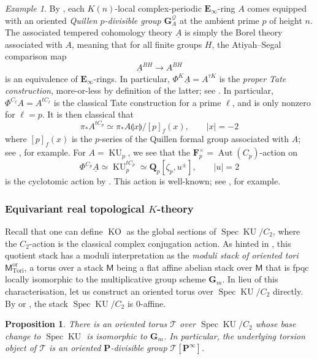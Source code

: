\documentclass[11pt, a4paper]{article}
\newcommand{\llpar}{\llparenthesis}
\newcommand{\rrpar}{\rrparenthesis}
\newcommand{\ori}{\mathrm{or}}
\DeclareMathOperator{\Spec}{Spec}
\newcommand{\1}{\mathbf{1}}
\DeclareMathOperator{\KU}{KU}
\DeclareMathOperator{\KO}{KO}
\newcommand{\Tori}{{\mathrm{Tori}}}
\DeclareMathOperator{\Aut}{Aut}
\newcommand{\ul}[1]{\underline{#1}}
\newcommand{\E}{\mathbf{E}}
\newcommand{\F}{\mathbf{F}}
\newcommand{\G}{\mathbf{G}}
\newcommand{\M}{\mathsf{M}}
\renewcommand{\P}{\mathbf{P}}
\newcommand{\Q}{\mathbf{Q}}
\newcommand{\calT}{\mathcal{T}}
\theoremstyle{plain}
\newtheorem{prop}[equation]{Proposition}
\theoremstyle{definition}
\theoremstyle{remark}\numberwithin{equation}{section}
\newtheorem{example}[equation]{Example}
\begin{document}
\begin{example}
By \cite[]{ec2}, each $K(n)$-local complex-periodic $\E_\infty$-ring $A$ comes equipped with an oriented \emph{Quillen $p$-divisible group} $\G^{\mathcal{Q}}_A$ at the ambient prime $p$ of height $n$. The associated tempered cohomology theory $\ul{A}$ is simply the Borel theory associated with $A$, meaning that for all finite groups $H$, the Atiyah--Segal comparison map
\[\ul{A}^{BH} \to A^{BH}\]
is an equivalence of $\E_\infty$-rings. In particular, $\Phi^K \ul{A} = A^{\tau K}$ is the \emph{proper Tate construction}, more-or-less by definition of the latter; see \cite[Ex.5.1.3]{temperedglobal}. In particular, $\Phi^{C_\ell} A = A^{tC_\ell}$ is the classical Tate construction for a prime $\ell$, and is only nonzero for $\ell=p$. It is then classical that 
\[\pi_\ast A^{tC_p} \simeq \pi_\ast A\llpar x\rrpar/[p]_f(x),\qquad |x|=-2\]
where $[p]_f(x)$ is the $p$-series of the Quillen formal group associated with $A$; see \cite[Lm.2.1]{ando_morava_sadofsky}, for example. For $A=\KU_p$, we see that the $\F_p^\times = \Aut(C_p)$-action on
    \[\Phi^{C_p} \ul{A} \simeq \KU_p^{tC_p} \simeq \Q_p[\zeta_p, u^\pm], \qquad |u|=2\]
is the cyclotomic action by . This action is well-known; see \cite{nikolausscholze}, for example.
\end{example}

\subsubsection{Equivariant real topological \texorpdfstring{$K$}{K}-theory}\label{sssec:KO}
Recall that one can define $\KO$ as the global sections of $\Spec \KU /C_2$, where the $C_2$-action is the classical complex conjugation action. As hinted in \cite[Rmk.3.8]{lurieecsurvey}, this quotient stack has a moduli interpretation as the \emph{moduli stack of oriented tori} $\M_\Tori^\ori$, a torus over a stack $\M$ being a flat affine abelian stack over $\M$ that is fpqc locally isomorphic to the multiplicative group scheme $\G_m$. In lieu of this characterisation, let us construct an oriented torus over $\Spec \KU / C_2$ directly. By \cite{akhilandlennart} or \cite[Ex.4.2.3.2 \& Th.4.4.0.2]{reconstruction}, the stack $\Spec \KU / C_2$ is 0-affine.

\begin{prop}\label{pr:universalorientedtorus}
    There is an oriented torus $\calT$ over $\Spec \KU / C_2$ whose base change to $\Spec \KU$ is isomorphic to $\G_m$. In particular, the underlying torsion object of $\calT$ is an oriented $\P$-divisible group $\calT[\P^\infty]$.
\end{prop}
\end{document}
